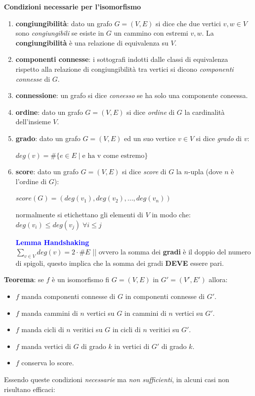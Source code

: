 \begin{flushleft}
    \textbf{Condizioni necessarie per l'isomorfismo}
    \begin{enumerate}[nosep]
        \item \textbf{congiungibilità}: dato un grafo $G = (V, E)$ si dice che due vertici $v, w \in V$ sono \textit{congiungibili} se esiste in $G$ un cammino con estremi $v, w$. La \textbf{congiungibilità} è una relazione di equivalenza su $V$.
        \item \textbf{componenti connesse}: i sottografi indotti dalle classi di equivalenza rispetto alla relazione di congiungibilità tra vertici si dicono \textit{componenti connesse} di $G$.
        \item \textbf{connessione}: un grafo si dice \textit{coneesso} se ha solo una componente coneessa.
        \item \textbf{ordine}: dato un grafo $G=(V, E)$ si dice \textit{ordine} di $G$ la cardinalità dell'insieme $V$.
        \item \textbf{grado}: dato un grafo $G=(V, E)$ ed un suo vertice $v \in V$ si dice \textit{grado} di $v$: 
        
        {\centering
            $deg(v) = \# \{e \in E \; | \; \text{e ha v come estremo}\}$
        \par}
        \item \textbf{score}: dato un grafo $G=(V, E)$ si dice \textit{score} di $G$ la $n$-upla (dove $n$ è l'ordine di $G$):

        {\centering
            $score(G) = (deg(v_1), deg(v_2), ..., deg(v_n))$
        \par}
        normalmente si etichettano gli elementi di $V$ in modo che: $deg(v_i) \leq deg(v_j) \; \forall i \leq j$
        \begin{boxA}
            \textcolor{blue}{\textbf{Lemma Handshaking}} \\
            $\underset{v \in V}{\sum} deg(v) = 2 \cdot \# E$ || ovvero la somma dei \textbf{gradi} è il doppio del numero di spigoli, questo implica che la somma dei gradi \textbf{DEVE} essere pari.
        \end{boxA}
    \end{enumerate}

    \textbf{Teorema}: se $f$ è un isomorfismo fi $G= (V, E)$ in $G' = (V', E')$ allora:
    \begin{itemize}[nosep]
        \item $f$ manda componenti connesse di $G$ in componenti connesse di $G'$.
        \item $f$ manda cammini di $n$ vertici su $G$ in cammini di $n$ vertici su $G'$.
        \item $f$ manda cicli di $n$ veritici su $G$ in cicli di $n$ veritici su $G'$.
        \item $f$ manda vertici di $G$ di grado $k$ in vertici di $G'$ di grado $k$.
        \item $f$ conserva lo score.
    \end{itemize}
    Essendo queste condizioni \textit{necessarie} ma \textit{non sufficienti}, in alcuni casi non risultano efficaci:


\end{flushleft}
